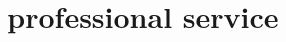 \documentclass[]{CV}
\begin{document}


















\section{ \faUserPlus \ \ \ professional service}
\end{document}
